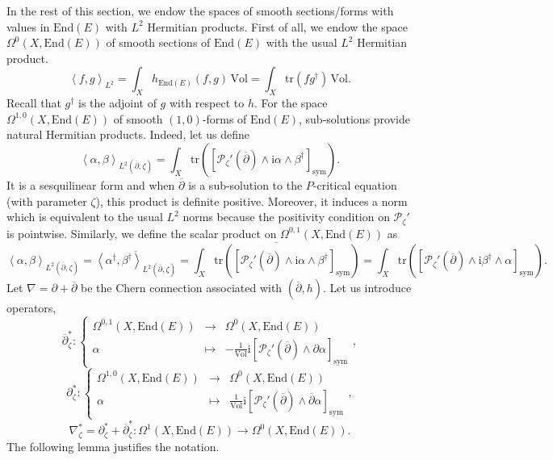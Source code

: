 \documentclass{article}
\theoremstyle{remark}
\theoremstyle{definition}
\newcommand{\End}{\mathrm{End}}
\newcommand{\tr}{\mathrm{tr}}
\newcommand{\Vol}{\mathrm{Vol}}
\renewcommand{\i}{\boldsymbol{\mathrm{i}}}
\newcommand{\scal}[2]{\left< #1,#2 \right>}
\newcommand{\mP}{\mathcal{P}}
\newcommand{\dbar}{\overline{\partial}}
\newcommand{\sym}{\mathrm{sym}}
\newcommand{\fonction}[4]{\left\{ \begin{array}{rcl}
		\displaystyle #1 & \longrightarrow & \displaystyle #2\\
		\displaystyle #3 & \longmapsto & \displaystyle #4
	\end{array} \right.}
\begin{document}
In the rest of this section, we endow the spaces of smooth sections/forms with values in $\End(E)$ with $L^2$ Hermitian products. First of all, we endow the space $\Omega^0(X,\End(E))$ of smooth sections of $\End(E)$ with the usual $L^2$ Hermitian product.
$$
\scal{f}{g}_{L^2} = \int_X h_{\End(E)}(f,g) \, \Vol = \int_X \tr(fg^\dagger) \, \Vol.
$$
Recall that $g^\dagger$ is the adjoint of $g$ with respect to $h$. For the space $\Omega^{1,0}(X,\End(E))$ of smooth $(1,0)$-forms of $\End(E)$, sub-solutions provide natural Hermitian products. Indeed, let us define
$$
\scal{\alpha}{\beta}_{L^2(\dbar,\zeta)} = \int_X \tr([\mP_\zeta'(\dbar) \wedge \i\alpha \wedge \beta^\dagger]_\sym).
$$
It is a sesquilinear form and when $\dbar$ is a sub-solution to the $P$-critical equation (with parameter $\zeta$), this product is definite positive. Moreover, it induces a norm which is equivalent to the usual $L^2$ norms because the positivity condition on $\mP_\zeta'$ is pointwise. Similarly, we define the scalar product on $\Omega^{0,1}(X,\End(E))$ as
$$
\scal{\alpha}{\beta}_{L^2(\dbar,\zeta)} = \overline{\scal{\alpha^\dagger}{\beta^\dagger}_{L^2(\dbar,\zeta)}} = \overline{\int_X \tr([\mP_\zeta'(\dbar) \wedge \i\alpha \wedge \beta^\dagger]_\sym)} = \int_X \tr([\mP_\zeta'(\dbar) \wedge \i\beta^\dagger \wedge \alpha]_\sym).
$$
Let $\nabla = \partial + \dbar$ be the Chern connection associated with $(\dbar,h)$. Let us introduce operators,
$$
\dbar_\zeta^* : \fonction{\Omega^{0,1}(X,\End(E))}{\Omega^0(X,\End(E))}{\alpha}{-\frac{1}{\Vol}\i[\mP_\zeta'(\dbar) \wedge \partial\alpha]_\sym},
$$
$$
\partial_\zeta^* : \fonction{\Omega^{1,0}(X,\End(E))}{\Omega^0(X,\End(E))}{\alpha}{\frac{1}{\Vol}\i[\mP_\zeta'(\dbar) \wedge \dbar\alpha]_\sym},
$$
$$
\nabla_\zeta^* = \partial_\zeta^* + \dbar_\zeta^* : \Omega^1(X,\End(E)) \rightarrow \Omega^0(X,\End(E)).
$$
The following lemma justifies the notation.
\end{document}
